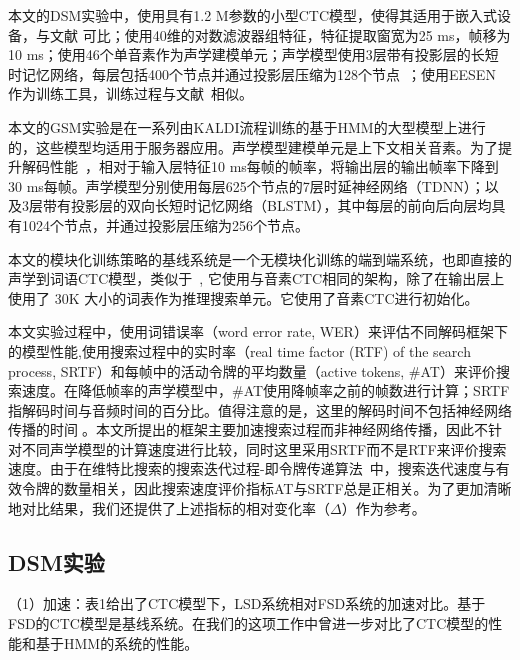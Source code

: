 本文的DSM实验中，使用具有1.2 M参数的小型CTC模型，使得其适用于嵌入式设备，与文献 \cite{mcgraw2016personalized}可比；使用40维的对数滤波器组特征，特征提取窗宽为25 ms，帧移为10 ms；使用46个单音素作为声学建模单元；声学模型使用3层带有投影层的长短时记忆网络，每层包括400个节点并通过投影层压缩为128个节点~\cite{sak2014long}；使用EESEN \cite{miao2016ctc}作为训练工具，训练过程与文献~\cite{miao2015eesen}相似。

本文的GSM实验是在一系列由KALDI流程\cite{povey2011kaldi}训练的基于HMM的大型模型上进行的，这些模型均适用于服务器应用。声学模型建模单元是上下文相关音素。为了提升解码性能~\cite{pundak2016lower,povey2016purely}，相对于输入层特征10 ms每帧的帧率，将输出层的输出帧率下降到30 ms每帧。声学模型分别使用每层625个节点的7层时延神经网络（TDNN）；以及3层带有投影层的双向长短时记忆网络（BLSTM），其中每层的前向后向层均具有1024个节点，并通过投影层压缩为256个节点。

本文的模块化训练策略的基线系统是一个无模块化训练的端到端系统，也即直接的声学到词语CTC模型，类似于~\cite{audhkhasi2017direct}, 它使用与音素CTC相同的架构，除了在输出层上使用了 30K 大小的词表作为推理搜索单元。它使用了音素CTC进行初始化。

本文实验过程中，使用词错误率（word error rate, WER）来评估不同解码框架下的模型性能,使用搜索过程中的实时率（real time factor (RTF) of the search process, SRTF）和每帧中的活动令牌的平均数量（active tokens, \#AT）来评价搜索速度。在降低帧率的声学模型中，\#AT使用降帧率之前的帧数进行计算；SRTF指解码时间与音频时间的百分比。值得注意的是，这里的解码时间不包括神经网络传播的时间\cite{you2009parallel,hauswald2015sirius}。本文所提出的框架主要加速搜索过程而非神经网络传播，因此不针对不同声学模型的计算速度进行比较，同时这里采用SRTF而不是RTF来评价搜索速度。由于在维特比搜索的搜索迭代过程-即令牌传递算法~\cite{hori2013speech}中，搜索迭代速度与有效令牌的数量相关，因此搜索速度评价指标AT与SRTF总是正相关。为了更加清晰地对比结果，我们还提供了上述指标的相对变化率（$\Delta$）作为参考。

\subsection{DSM实验}
\label{exp:dsm}

（1）加速：表1给出了CTC模型下，LSD系统相对FSD系统的加速对比。基于FSD的CTC模型是基线系统。在我们的这项工作中\cite{7736093}曾进一步对比了CTC模型的性能和基于HMM的系统的性能。



